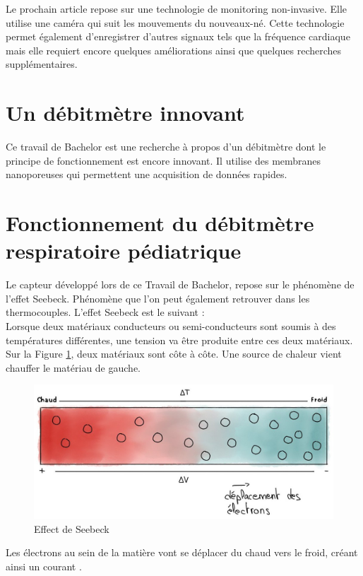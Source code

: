 Le prochain article repose sur une technologie de monitoring non-invasive. Elle utilise une caméra qui suit les mouvements du nouveaux-né. 
Cette technologie permet également d'enregistrer d'autres signaux tels que la fréquence cardiaque mais elle requiert encore quelques améliorations 
ainsi que quelques recherches supplémentaires. 


\section{Un débitmètre innovant}
Ce travail de Bachelor est une recherche à propos d'un débitmètre dont le principe de fonctionnement est encore innovant. Il utilise des 
membranes nanoporeuses qui permettent une acquisition de données rapides. 

\section{Fonctionnement du débitmètre respiratoire pédiatrique}
Le capteur développé lors de ce Travail de Bachelor, repose sur le phénomène de l'effet Seebeck. Phénomène que l'on peut également retrouver 
dans les thermocouples. L'effet Seebeck est le suivant :\\
Lorsque deux matériaux conducteurs ou semi-conducteurs sont soumis à des températures différentes, une tension va être produite entre ces deux matériaux. \\
Sur la Figure \ref{fig:Seebeck}, deux matériaux sont côte à côte. Une source de chaleur vient chauffer le matériau de gauche. 
\begin{figure}[H]
    \centering
    \includegraphics[scale = 0.3]{images/Seebeck.jpg}
    \caption{Effect de Seebeck}
    \label{fig:Seebeck}
\end{figure}
Les électrons au sein de la matière vont se déplacer du chaud vers le froid, créant ainsi un courant \cite{instrumentys_effet_2021}.\\
